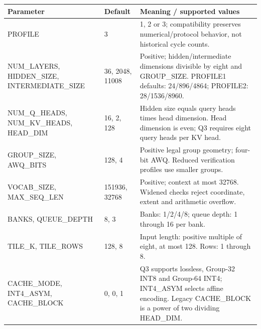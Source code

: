 \documentclass[11pt,a4paper]{article}
\begin{document}
{\small\renewcommand{\arraystretch}{1.18}\begin{longtable}{@{}L{0.22\textwidth}|L{0.21\textwidth}|L{0.49\textwidth}@{}}\toprule

\textbf{Parameter} & \textbf{Default} & \textbf{Meaning /\allowbreak{} supported values}\\\midrule\endhead

PROFILE & 3 & 1,\allowbreak{} 2 or 3; compatibility preserves numerical/\allowbreak{}protocol behavior,\allowbreak{} not historical cycle counts.\\[2pt]\hline

NUM\_\allowbreak{}LAYERS,\allowbreak{} HIDDEN\_\allowbreak{}SIZE,\allowbreak{} INTERMEDIATE\_\allowbreak{}SIZE & 36,\allowbreak{} 2048,\allowbreak{} 11008 & Positive; hidden/\allowbreak{}intermediate dimensions divisible by eight and GROUP\_\allowbreak{}SIZE. PROFILE1 defaults: 24/\allowbreak{}896/\allowbreak{}4864; PROFILE2: 28/\allowbreak{}1536/\allowbreak{}8960.\\[2pt]\hline

NUM\_\allowbreak{}Q\_\allowbreak{}HEADS,\allowbreak{} NUM\_\allowbreak{}KV\_\allowbreak{}HEADS,\allowbreak{} HEAD\_\allowbreak{}DIM & 16,\allowbreak{} 2,\allowbreak{} 128 & Hidden size equals query heads times head dimension. Head dimension is even; Q3 requires eight query heads per KV head.\\[2pt]\hline

GROUP\_\allowbreak{}SIZE,\allowbreak{} AWQ\_\allowbreak{}BITS & 128,\allowbreak{} 4 & Positive legal group geometry; four-bit AWQ. Reduced verification profiles use smaller groups.\\[2pt]\hline

VOCAB\_\allowbreak{}SIZE,\allowbreak{} MAX\_\allowbreak{}SEQ\_\allowbreak{}LEN & 151936,\allowbreak{} 32768 & Positive; context at most 32768. Widened checks reject coordinate,\allowbreak{} extent and arithmetic overflow.\\[2pt]\hline

BANKS,\allowbreak{} QUEUE\_\allowbreak{}DEPTH & 8,\allowbreak{} 3 & Banks: 1/\allowbreak{}2/\allowbreak{}4/\allowbreak{}8; queue depth: 1 through 16 per bank.\\[2pt]\hline

TILE\_\allowbreak{}K,\allowbreak{} TILE\_\allowbreak{}ROWS & 128,\allowbreak{} 8 & Input length: positive multiple of eight,\allowbreak{} at most 128. Rows: 1 through 8.\\[2pt]\hline

CACHE\_\allowbreak{}MODE,\allowbreak{} INT4\_\allowbreak{}ASYM,\allowbreak{} CACHE\_\allowbreak{}BLOCK & 0,\allowbreak{} 0,\allowbreak{} 1 & Q3 supports lossless,\allowbreak{} Group-32 INT8 and Group-64 INT4; INT4\_\allowbreak{}ASYM selects affine encoding. Legacy CACHE\_\allowbreak{}BLOCK is a power of two dividing HEAD\_\allowbreak{}DIM.\\[2pt]\hline

\bottomrule\end{longtable}}
\end{document}
